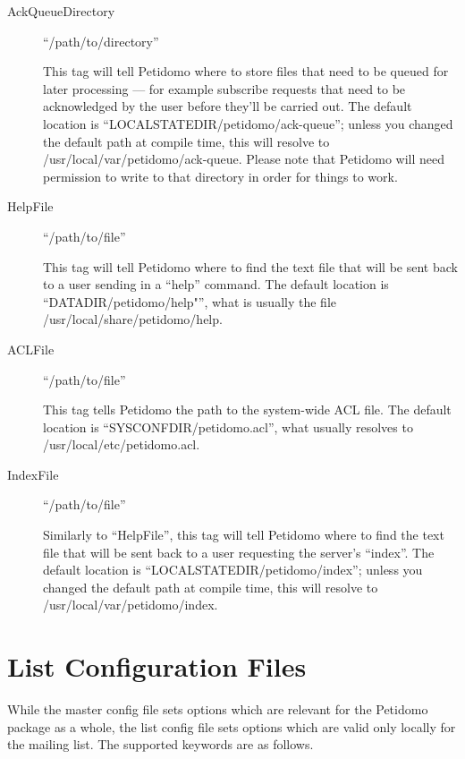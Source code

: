 \documentclass[a4paper,11pt]{scrreprt}
\newcommand{\file}[1]{{\sf #1}}
\begin{document}
\begin{description}
\item[AckQueueDirectory] \hfill ``/path/to/directory''

This tag will tell Petidomo where to store files that need to be
queued for later processing --- for example subscribe requests that
need to be acknowledged by the user before they'll be carried out. The
default location is ``LOCALSTATEDIR/petidomo/ack-queue''; unless you
changed the default path at compile time, this will resolve to
\file{/usr/local/var/petidomo/ack-queue}. Please note that Petidomo
will need permission to write to that directory in order for things to
work.

\item[HelpFile] \hfill ``/path/to/file''

This tag will tell Petidomo where to find the text file that will be
sent back to a user sending in a ``help'' command. The default
location is ``DATADIR/petidomo/help"'', what is usually the file
\file{/usr/local/share/petidomo/help}.


\item[ACLFile] \hfill ``/path/to/file''

This tag tells Petidomo the path to the system-wide ACL file. The
default location is ``SYSCONFDIR/petidomo.acl'', what usually resolves
to \file{/usr/local/etc/petidomo.acl}.

\item[IndexFile] \hfill ``/path/to/file''

Similarly to ``HelpFile'', this tag will tell Petidomo where to find
the text file that will be sent back to a user requesting the server's
``index''. The default location is ``LOCALSTATEDIR/petidomo/index'';
unless you changed the default path at compile time, this will resolve
to \file{/usr/local/var/petidomo/index}.

\end{description}

\section{List Configuration Files}
\label{list config file}

While the master config file sets options which are relevant for the
Petidomo package as a whole, the list config file sets options which
are valid only locally for the mailing list. The supported keywords
are as follows.
\end{document}
